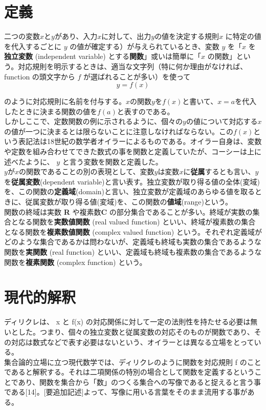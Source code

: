 \documentclass[a4j,12pt]{jreport}
\begin{document}
\section{定義}
二つの変数$x$と$y$があり、入力$x$に対して、出力$y$の値を決定する規則$x$ に特定の値を代入するごとに $y$ の値が確定する）が与えられているとき、変数 $y$ を「$x$ を{\bf 独立変数} (independent variable) とする{\bf 関数}」或いは簡単に「$x$ の関数」という。対応規則を明示するときは、適当な文字列（特に何か理由がなければ、function の頭文字から $f$ が選ばれることが多い）を使って\\

\begin{equation}
y = f(x)
\end{equation}

のように対応規則に名前を付与する。$x$の関数$y$を$f(x)$と書いて、$x=a$を代入したときに決まる関数の値を$f(a)$と表すのである。\\
しかしここで、定数関数の例に示されるように、個々の$y$の値について対応する$x$の値が一つに決まるとは限らないことに注意しなければならない。この$f(x)$という表記法は18世紀の数学者オイラーによるものである。オイラー自身は、変数や定数を組み合わせてできた数式の事を関数と定義していたが、コーシーは上に述べたように、 $y$ と言う変数を関数と定義した。\\
$y$が$x$の関数であることの別の表現として、変数$y$は変数$x$に{\bf 従属}するとも言い、$y$を{\bf 従属変数}(dependent variable)と言い表す。独立変数が取り得る値の全体(変域)を、この関数の{\bf 定義域}(domain)と言い、独立変数が定義域のあらゆる値を取るときに、従属変数が取り得る値(変域)を、この関数の{\bf 値域}(range)という。\\
関数の終域は実数 {\bf R} や複素数{\bf C} の部分集合であることが多い。終域が実数の集合となる関数を{\bf 実数値関数} (real valued function) といい、終域が複素数の集合となる関数を{\bf 複素数値関数} (complex valued function) という。それぞれ定義域がどのような集合であるかは問わないが、定義域も終域も実数の集合であるような関数を{\bf 実関数} (real function) といい、定義域も終域も複素数の集合であるような関数を{\bf 複素関数} (complex function) という。\\

\section{現代的解釈}
ディリクレは、 x と f(x) の対応関係に対して一定の法則性を持たせる必要は無いとした。つまり、個々の独立変数と従属変数の対応そのものが関数であり、その対応は数式などで表す必要はないという、オイラーとは異なる立場をとっている。\\
集合論的立場に立つ現代数学では、ディリクレのように関数を対応規則 f のことであると解釈する。それは二項関係の特別の場合として関数を定義するということであり、関数を集合から「数」のつくる集合への写像であると捉えると言う事である[14]。[要追加記述]よって、写像に用いる言葉をそのまま流用する事がある。
\end{document}
